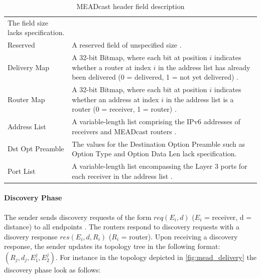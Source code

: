 \begin{table}[!htbp]
\begin{tabularx}{\textwidth}{lX}
                The field size lacks specification.\\
Reserved      & A reserved field of unspecified size \cite{meadcast2}. \\
Delivery Map  & A 32-bit Bitmap, where each bit at position $i$ indicates
                whether a router at index $i$ in the address list has already
                been delivered (0 = delivered, 1 = not yet delivered)
                \cite{meadcast2}. \\
Router Map    & A 32-bit Bitmap, where each bit at position $i$ indicates
                whether an address at index $i$ in the address list is a
                router (0 = receiver, 1 = router) \cite{meadcast2}.\\
Address List  & A variable-length list comprising the IPv6 addresses of
                receivers and MEADcast routers \cite{meadcast2}. \\ \midrule
Dst Opt Preamble & The values for the Destination Option Preamble such as
                    Option Type and Option Data Len lack specification. \\
Port List     & A variable-length list encompassing the Layer 3 ports for each
                receiver in the address list \cite{meadcast2}.\\
\bottomrule
\end{tabularx}
\caption{MEADcast header field description}
\label{tab:02_meadcast_header}
\end{table}
\egroup

\paragraph{Discovery Phase} %
\label{par:Discovery Phase}
The sender sends discovery requests of the form $req(E_i, d)$ ($E_i$ =
    receiver, d = distance) to all endpoints \cite{meadcast1}.
The routers respond to discovery requests with a disovery response
    $res(E_i, d, R_i)$ ($R_i$ = router).
Upon receiving a discovery response, the sender updates its topology tree in
    the following format: $(R_j,d_j,E_1^j,E_2^j)$.
For instance in the topology depicted in \autoref{fig:mead_delivery} the
    discovery phase look as follows:

